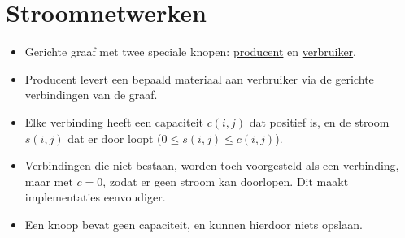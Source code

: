 \documentclass{report}
\begin{document}
\chapter{Stroomnetwerken}
\begin{itemize}
	\item Gerichte graaf met twee speciale knopen: \underline{producent} en \underline{verbruiker}.
	\item Producent levert een bepaald materiaal aan verbruiker via de gerichte verbindingen van de graaf.
	\item Elke verbinding heeft een capaciteit $c(i, j)$ dat positief is, en de stroom $s(i, j)$ dat er door loopt ($0 \leq s(i, j) \leq c(i, j)$). 
	\item Verbindingen die niet bestaan, worden toch voorgesteld als een verbinding, maar met $c = 0$, zodat er geen stroom kan doorlopen. Dit maakt implementaties eenvoudiger.
	\item Een knoop bevat geen capaciteit, en kunnen hierdoor niets opslaan.
\end{itemize}
\end{document}
